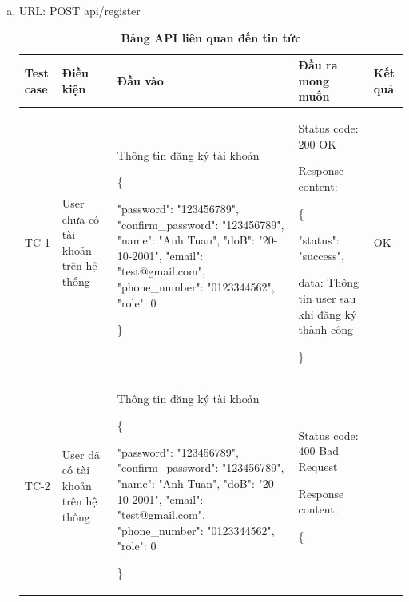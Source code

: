 \begin{enumerate}[a)]
  \item URL: POST api/register
  
  \begin{xltabular}{\textwidth}{
    | >{\raggedright\arraybackslash}m{1cm}
    | >{\raggedright\arraybackslash}X
    | >{\raggedright\arraybackslash}X
    | >{\raggedright\arraybackslash}X
    | >{\raggedright\arraybackslash}m{1cm}|
    }
    \caption{\bfseries \fontsize{12pt}{0pt}\selectfont Bảng API liên quan đến tin tức}
    \\
    \hline
    \bfseries Test case    &\bfseries Điều kiện   &\bfseries Đầu vào 
    &\bfseries Đầu ra mong muốn &\bfseries Kết quả\\ \hline
  
  
    TC-1
    & User chưa có tài khoản trên hệ thống
    & Thông tin đăng ký tài khoản

    \{

    "password": "123456789",
    "confirm\_password": "123456789",
    "name": "Anh Tuan",
    "doB": "20-10-2001",
    "email": "test@gmail.com",
    "phone\_number": "0123344562",
    "role": 0

   \}
  
    & 
  
    Status code: 200 OK
  
      Response content:
  
      \{
  
    "status": "success",
  
    data: Thông tin user sau khi đăng ký thành công
  
    \}
    
    & OK
  
    \\ \hline
  
    TC-2
    & User đã có tài khoản trên hệ thống
    & Thông tin đăng ký tài khoản

    \{

    "password": "123456789",
    "confirm\_password": "123456789",
    "name": "Anh Tuan",
    "doB": "20-10-2001",
    "email": "test@gmail.com",
    "phone\_number": "0123344562",
    "role": 0

   \}
  
    & 
  
    Status code: 400 Bad Request
  
      Response content:
  
      \{
  

\end{xltabular}
\end{enumerate}
